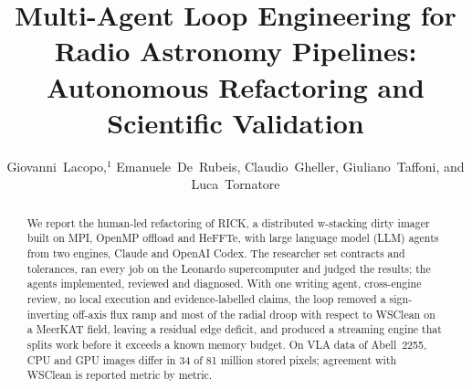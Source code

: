 \documentclass[11pt,twoside]{article}
\begin{document}
\title{Multi-Agent Loop Engineering for Radio Astronomy Pipelines: Autonomous Refactoring and Scientific Validation}

\author{Giovanni~Lacopo,$^1$ Emanuele~De~Rubeis, Claudio~Gheller, Giuliano~Taffoni, and Luca~Tornatore}




\begin{abstract}
We report the human-led refactoring of RICK, a distributed w-stacking dirty
imager built on MPI, OpenMP offload and HeFFTe, with large language model
(LLM) agents from two engines, Claude and OpenAI Codex. The researcher set
contracts and tolerances, ran every job on the Leonardo supercomputer and
judged the results; the agents implemented, reviewed and diagnosed. With one
writing agent, cross-engine review, no local execution and evidence-labelled
claims, the loop removed a
sign-inverting off-axis flux ramp and most of the radial droop with respect to
WSClean on a MeerKAT field, leaving a residual edge deficit, and produced a
streaming engine that splits work before it exceeds a known memory budget. On
VLA data of Abell~2255, CPU and GPU images differ in 34 of 81 million stored
pixels; agreement with WSClean is reported metric by metric.
\end{abstract}
\end{document}
